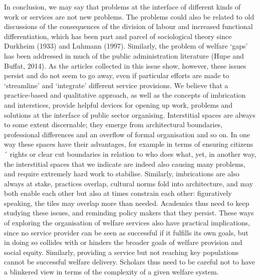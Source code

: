 In conclusion, we may say that problems at the interface of different kinds of work or services are not new problems.  The problems could also be related to old discussions of the consequences of the division of labour and increased functional differentiation, which has been part and parcel of sociological theory since Durkheim (1933) and Luhmann (1997). Similarly, the problem of welfare ‘gaps’ has been addressed in much of the public administration literature (Hupe and Buffat, 2014). As the articles collected in this issue show, however, these issues persist and do not seem to go away, even if particular efforts are made to ‘streamline’ and ‘integrate’ different service provisions. We believe that a practice-based and qualitative approach, as well as the concepts of imbrication and interstices, provide helpful devices for opening up work, problems and solutions at the interface of public sector organising. Interstitial spaces are always to some extent discernable; they emerge from architectural boundaries, professional differences and an overflow of formal organisation and so on. In one way these spaces have their advantages, for example in terms of ensuring citizens´ rights or clear cut boundaries in relation to who does what, yet, in another way, the interstitial spaces that we indicate are indeed also causing many problems, and require extremely hard work to stabilise. Similarly, imbrications are also always at stake, practices overlap, cultural norms fold into architecture, and may both enable each other but also at times constrain each other: figuratively speaking, the tiles may overlap more than needed. Academics thus need to keep studying these issues, and reminding policy makers that they persist. These ways of exploring the organisation of welfare services also have practical implications, since no service provider can be seen as successful if it fulfills its own goals, but in doing so collides with or hinders the broader goals of welfare provision and social equity.  Similarly, providing a service but not reaching key populations cannot be successful welfare delivery. Scholars thus need to be careful not to have a blinkered view in terms of the complexity of a given welfare system.
